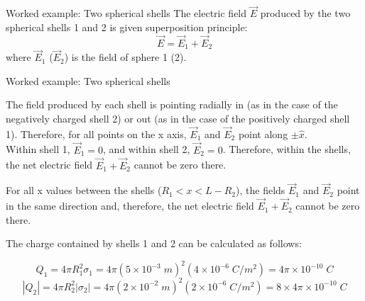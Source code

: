 {\begin{frame}{Worked example: Two spherical shells}
  \vspace{0.2cm}
  The electric field $\vec{E}$ produced by the two spherical shells 1 and 2
  is given superposition principle:
  \begin{equation*}
    \vec{E} = \vec{E}_1 + \vec{E}_2
  \end{equation*}
  where $\vec{E}_1$ ($\vec{E}_2$) is the field of sphere 1 (2).\\

\end{frame}

%
%
%

\begin{frame}{Worked example: Two spherical shells}

  The field produced by each shell is pointing radially in (as in the case of
  the negatively charged shell 2) or out (as in the case of the positively
  charged shell 1). Therefore, for all points on the x axis,
  $\vec{E}_1$ and $\vec{E}_2$ point along $\pm \hat{x}$.\\

  \vspace{0.3cm}
  Within shell 1, $\vec{E}_1 = 0$, and within shell 2, $\vec{E}_2 = 0$.
  Therefore, within the shells, the net electric field $\vec{E}_1 + \vec{E}_2$
  cannot be zero there.\\

  \vspace{0.3cm}

  For all x values between the shells ($R_1 < x < L-R_2$),
  the fields $\vec{E}_1$ and $\vec{E}_2$ point in the same direction
  and, therefore, the net electric field $\vec{E}_1 + \vec{E}_2$
  cannot be zero there.\\

  \vspace{0.3cm}

  The charge contained by shells 1 and 2 can be calculated as follows:

  \begin{equation*}
  	 Q_1 = 4\pi R_{1}^{2} \sigma_{1}
         = 4\pi (5\times 10^{-3} \; m)^{2} (4 \times 10^{-6} \; C/m^2)
         = 4\pi \times 10^{-10} \; C
  \end{equation*}
  \begin{equation*}
  	|Q_2| = 4\pi R_{2}^{2} |\sigma_{2}|
          = 4\pi (2\times 10^{-2} \; m)^{2} (2 \times 10^{-6} \; C/m^2)
          = 8 \times 4\pi \times 10^{-10} \; C
  \end{equation*}

\end{frame}

}
